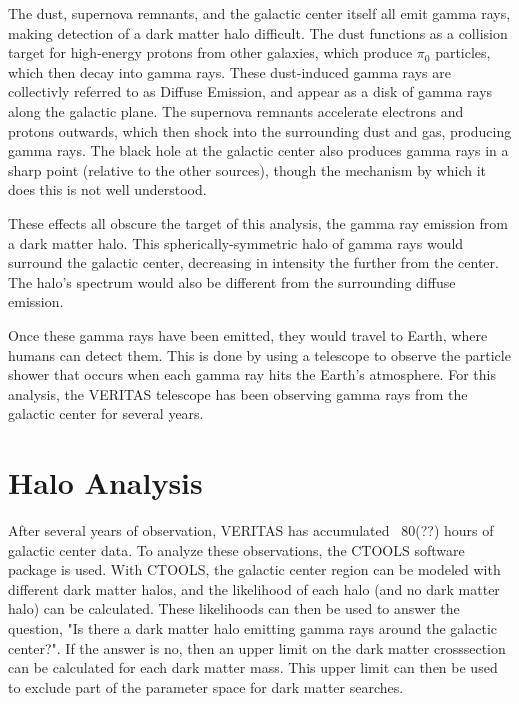 The dust, supernova remnants, and the galactic center itself all emit gamma rays, making detection of a dark matter halo difficult.
The dust functions as a collision target for high-energy protons from other galaxies, which produce $\pi_0$ particles, which then decay into gamma rays.
These dust-induced gamma rays are collectivly referred to as Diffuse Emission, and appear as a disk of gamma rays along the galactic plane.
The supernova remnants accelerate electrons and protons outwards, which then shock into the surrounding dust and gas, producing gamma rays.
The black hole at the galactic center also produces gamma rays in a sharp point (relative to the other sources), though the mechanism by which it does this is not well understood\cite{gal_cent_still_undetermined}.

These effects all obscure the target of this analysis, the gamma ray emission from a dark matter halo.
This spherically-symmetric halo of gamma rays would surround the galactic center, decreasing in intensity the further from the center.
The halo's spectrum would also be different from the surrounding diffuse emission.

Once these gamma rays have been emitted, they would travel to Earth, where humans can detect them.
This is done by using a telescope to observe the particle shower that occurs when each gamma ray hits the Earth's atmosphere.
For this analysis, the VERITAS telescope has been observing gamma rays from the galactic center for several years.

\section{Halo Analysis}
After several years of observation, VERITAS has accumulated ~80(??) hours of galactic center data.
To analyze these observations, the CTOOLS software package is used.
With CTOOLS, the galactic center region can be modeled with different dark matter halos, and the likelihood of each halo (and no dark matter halo) can be calculated.
These likelihoods can then be used to answer the question, "Is there a dark matter halo emitting gamma rays around the galactic center?".
If the answer is no, then an upper limit on the dark matter crosssection can be calculated for each dark matter mass.
This upper limit can then be used to exclude part of the parameter space for dark matter searches.


